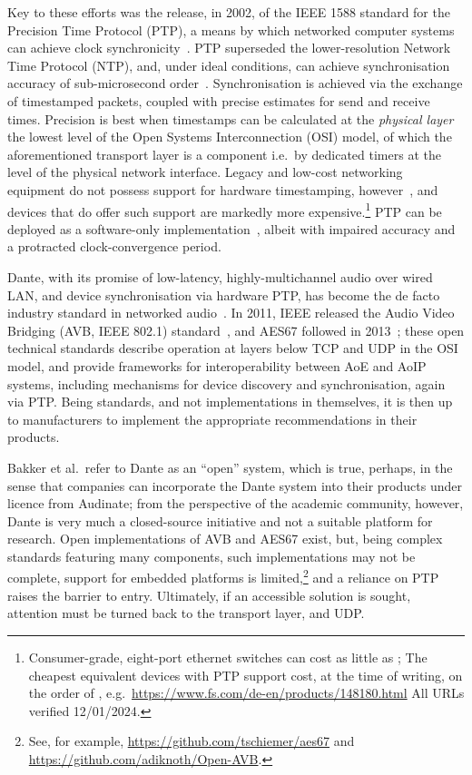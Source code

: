 Key to these efforts was the release, in 2002, of the IEEE 1588 standard for the
Precision Time Protocol (PTP), a means by which networked computer systems
can achieve clock synchronicity~\citep{edison_ieee-1588_2002}.
PTP superseded the lower-resolution Network Time Protocol (NTP), and, under
ideal conditions, can achieve synchronisation accuracy of sub-microsecond
order~\citep{tongzhou_research_2022}.
Synchronisation is achieved via the exchange of timestamped packets, coupled
with precise estimates for send and receive times.
Precision is best when timestamps can be calculated at the \textit{physical
layer} \textemdash{} the lowest level of the Open Systems Interconnection (OSI)
model, of which the aforementioned transport layer is a component \textemdash{}
i.e.\ by dedicated timers at the level of the physical network interface.
Legacy and low-cost networking equipment do not possess support for hardware
timestamping, however~\citep{correll_design_2005}, and devices that do offer
such support are markedly more expensive.\footnote{
    Consumer-grade, eight-port ethernet switches can cost as little as
    ;
    The cheapest equivalent devices with PTP support cost, at the time of
    writing, on the order of , e.g.\
    \url{https://www.fs.com/de-en/products/148180.html} \textemdash{} All URLs
    verified 12/01/2024.
}
PTP can be deployed as a software-only
implementation~\citep{correll_design_2005}, albeit with impaired accuracy and
a protracted clock-convergence period.

Dante, with its promise of low-latency, highly-multichannel audio over wired
LAN, and device synchronisation via hardware PTP, has become the de facto
industry standard in networked audio~\citep{bakker_introduction_2014}.
In 2011, IEEE released the Audio Video Bridging (AVB, IEEE 802.1)
standard~\citep{ieee_ieee_2011}, and AES67 followed in
2013~\citep{hildebrand_aes67-2013_2014};
these open technical standards describe operation at layers below TCP and UDP
in the OSI model, and provide frameworks for
interoperability between AoE and AoIP systems, including mechanisms for device
discovery and synchronisation, again via PTP\@.
Being standards, and not implementations in themselves, it is then up to
manufacturers to implement the appropriate recommendations in their products.

Bakker et al.\ refer to Dante as an ``open'' system, which is true, perhaps, in
the sense that companies can incorporate the Dante system into their products
under licence from Audinate;
from the perspective of the academic community, however, Dante is very much a
closed-source initiative and not a suitable platform for research.
Open implementations of AVB and AES67 exist, but, being complex standards
featuring many components, such implementations may not be complete, support for
embedded platforms is limited,\footnote{
    See, for example, \url{https://github.com/tschiemer/aes67} and
    \url{https://github.com/adiknoth/Open-AVB}.
} and a reliance on PTP raises the barrier to entry.
Ultimately, if an accessible solution is sought, attention must be turned back
to the transport layer, and UDP\@.


